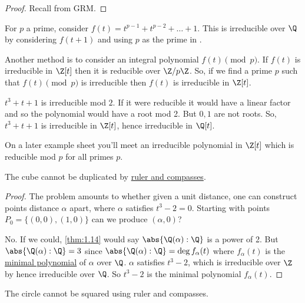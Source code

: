 \documentclass{article}
\begin{document}
\begin{proof}
    Recall from GRM.
\end{proof}

\begin{eg}
    For $p$ a prime, consider $f(t) = t^{p-1} + t^{p-2} + \dots + 1$.  This is irreducible over $\Q$ by considering $f(t+1)$ and using $p$ as the prime in .
\end{eg}

Another method is to consider an integral polynomial $f(t) \pmod{p}$. If $f(t)$ is irreducible in $\Z[t]$ then it is reducible over $\Z / p \Z$. So, if we find a prime $p$ such that $f(t) \pmod{p}$ is irreducible then $f(t)$ is irreducible in $\Z[t]$.

\begin{eg}
    $t^3 + t + 1$ is irreducible mod $2$.
    If it were reducible it would have a linear factor and so the polynomial would have a root mod 2.
    But $0, 1$ are not roots.
    So, $t^3 + t + 1$ is irreducible in $\Z[t]$, hence irreducible in $\Q[t]$.
\end{eg}

\begin{remark}
    On a later example sheet you'll meet an irreducible polynomial in $\Z[t]$ which is reducible mod $p$ for all primes $p$.
\end{remark}

\begin{nthm}\label{thm:1.17}
    The cube cannot be duplicated by \hyperlink{def:constructible}{ruler and compasses}.
\end{nthm}

\begin{proof}
    The problem amounts to whether given a unit distance, one can construct points distance $\alpha$ apart, where $\alpha$ satisfies $t^3 - 2 = 0$.
    Starting with points $P_0 = \{(0, 0), (1, 0)\}$ can we produce $(\alpha, 0)$?

    No. If we could, \cref{thm:1.14} would say $\abs{\Q(\alpha):\Q}$ is a power of 2. But $\abs{\Q(\alpha): \Q} = 3$ since $\abs{\Q(\alpha):\Q} = \deg f_\alpha(t)$ where $f_\alpha(t)$ is the \hyperlink{def:minimalPoly}{minimal polynomial} of $\alpha$ over $\Q$. $\alpha$ satisfies $t^3 - 2$, which is irreducible over $\Z$ by  hence irreducible over $\Q$. So $t^3 - 2$ is the minimal polynomial $f_\alpha(t)$.
\end{proof}

\begin{nthm}\label{thm:1.18}
    The circle cannot be squared using ruler and compasses.
\end{nthm}
\end{document}
